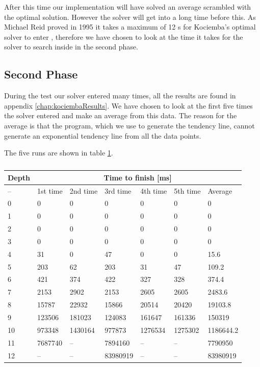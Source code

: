 After this time our implementation will have solved an average scrambled \rubik{} with the optimal solution.
However the solver will get into  a long time before this.
As Michael Reid proved in 1995 \cite{knowledgerush2} it takes a maximum of 12 \twist{}s for Kociemba's optimal solver to enter , therefore we have chosen to look at the time it takes for the solver to search inside  in the second phase.

\subsection{Second Phase}
During the test our solver entered  many times, all the results are found in appendix \ref{chap:kociembaResults}.
We have chosen to look at the first five times the solver entered  and make an average from this data.
The reason for the average is that the program, which we use to generate the tendency line, cannot generate an exponential tendency line from all the data points.

The five runs are shown in table \ref{tab:timeData2}.
\begin{table}[htb]
\centering
	\begin{tabular}{|l|l|l|l|l|l|l|}
	\hline
	Depth& \multicolumn{6}{|c|}{Time to finish [ms]}\\
	\hline
	--&1st time&2nd time&3rd time&4th time&5th time&Average\\
	\hline
	0&0&0&0&0&0&0\\
	\hline
	1&0&0&0&0&0&0\\
	\hline
	2&0&0&0&0&0&0\\
	\hline
	3&0&0&0&0&0&0\\
	\hline
	4&31&0&47&0&0&15.6\\
	\hline
	5&203&62&203&31&47&109.2\\
	\hline
	6&421&374&422&327&328&374.4\\
	\hline
	7&2153&2902&2153&2605&2605&2483.6\\
	\hline
	8&15787&22932&15866&20514&20420&19103.8\\
	\hline
	9&123506&181023&124083&161647&161336&150319\\
	\hline
	10&973348&1430164&977873&1276534&1275302&1186644.2\\
	\hline
	11&7687740&--&7894160&--&--&7790950\\
	\hline
	12&--&--&83980919&--&--&83980919\\
	\hline
	\end{tabular}
\caption{}
	\label{tab:timeData2}
\end{table}


